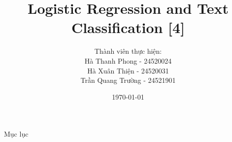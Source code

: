 \documentclass[11pt]{beamer}
\author[University of Information Technology]{Thành viên thực hiện: \\ Hà Thanh Phong - 24520024 \\ Hà Xuân Thiện - 24520031 \\ Trần Quang Trường - 24521901}
\title[LR\&TC]{Logistic Regression and Text Classification [4]}
\institute[]{University of Information Technology - VNUHCM}
\date{\today}
\begin{document}
	
	\begin{frame}
		\titlepage
	\end{frame}
	
	\begin{frame}{Mục lục}
		\tableofcontents 
	\end{frame}

	
	
	
\end{document}
